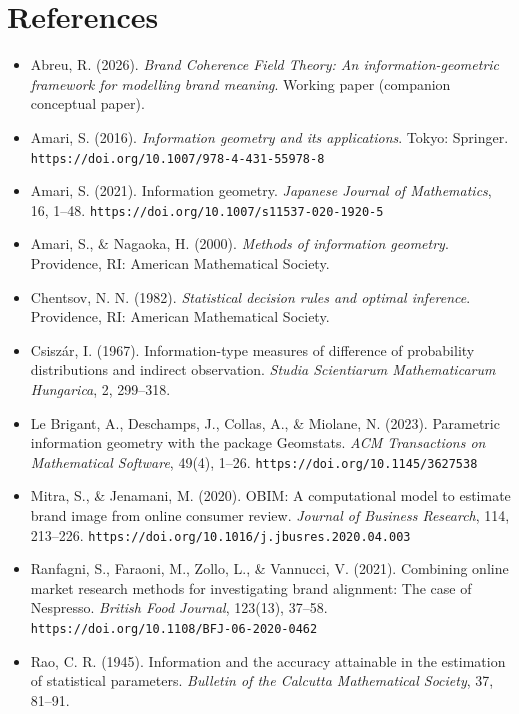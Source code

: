 \documentclass[11pt]{article}
\theoremstyle{remark}
\begin{document}
\section*{References}
\small
\begin{itemize}\setlength\itemsep{1pt}
\item[] Abreu, R. (2026). \emph{Brand Coherence Field Theory: An
information-geometric framework for modelling brand meaning}. Working paper
(companion conceptual paper).
\item[] Amari, S. (2016). \emph{Information geometry and its applications}.
Tokyo: Springer. \texttt{https://doi.org/10.1007/978-4-431-55978-8}
\item[] Amari, S. (2021). Information geometry. \emph{Japanese Journal of
Mathematics}, 16, 1--48. \texttt{https://doi.org/10.1007/s11537-020-1920-5}
\item[] Amari, S., \& Nagaoka, H. (2000). \emph{Methods of information
geometry}. Providence, RI: American Mathematical Society.
\item[] Chentsov, N. N. (1982). \emph{Statistical decision rules and optimal
inference}. Providence, RI: American Mathematical Society.
\item[] Csisz\'ar, I. (1967). Information-type measures of difference of
probability distributions and indirect observation. \emph{Studia Scientiarum
Mathematicarum Hungarica}, 2, 299--318.
\item[] Le Brigant, A., Deschamps, J., Collas, A., \& Miolane, N. (2023).
Parametric information geometry with the package Geomstats. \emph{ACM
Transactions on Mathematical Software}, 49(4), 1--26.
\texttt{https://doi.org/10.1145/3627538}
\item[] Mitra, S., \& Jenamani, M. (2020). OBIM: A computational model to
estimate brand image from online consumer review. \emph{Journal of Business
Research}, 114, 213--226.
\texttt{https://doi.org/10.1016/j.jbusres.2020.04.003}
\item[] Ranfagni, S., Faraoni, M., Zollo, L., \& Vannucci, V. (2021). Combining
online market research methods for investigating brand alignment: The case of
Nespresso. \emph{British Food Journal}, 123(13), 37--58.
\texttt{https://doi.org/10.1108/BFJ-06-2020-0462}
\item[] Rao, C. R. (1945). Information and the accuracy attainable in the
estimation of statistical parameters. \emph{Bulletin of the Calcutta
Mathematical Society}, 37, 81--91.
\end{itemize}
\end{document}
